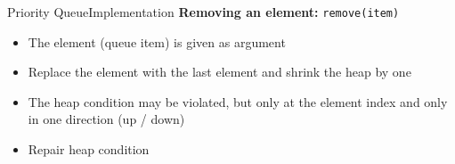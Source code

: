 \begin{frame}{Priority Queue}{Implementation}
  \textbf{Removing an element:}
  {\color{Mittel-Blau}\texttt{remove(item)}}
  \begin{itemize}
    \item
      The element (queue item) is given as argument
    \item
      Replace the element with the last element and shrink the heap by one
    \item
      The {\color{Mittel-Blau}heap condition} may be violated, but only at the
      element index and only in one direction (up / down)
    \item
      Repair {\color{Mittel-Blau}heap condition}
  \end{itemize}
    \begin{figure}[!h]
      \begin{adjustbox}{height=0.275\linewidth}
      \end{adjustbox}
      \hspace{0.5em}\hspace{-1.0em}
      \begin{adjustbox}{height=0.275\linewidth}
      \end{adjustbox}
      \label{fig:priority_queue:impl_remove}%
    \end{figure}%
\end{frame}



